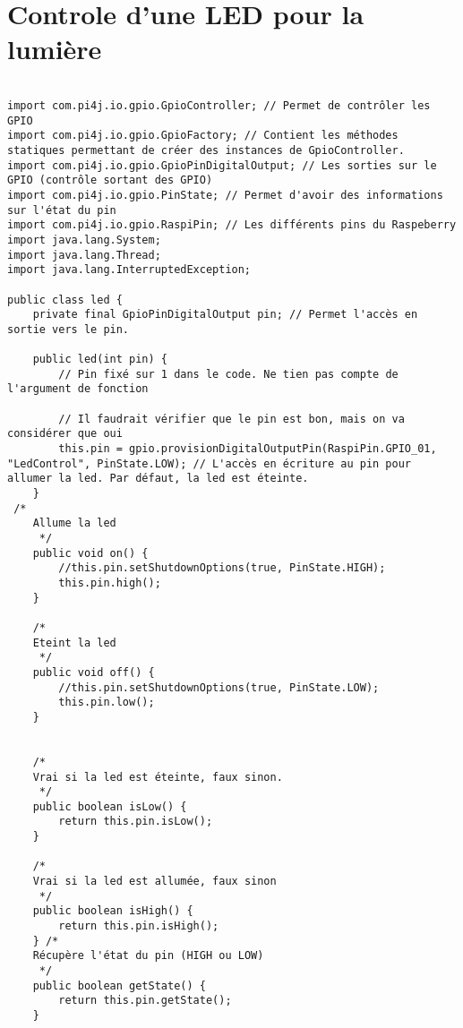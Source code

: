 \documentclass{article}
\newenvironment{DDbox}[1]{
\begin{lrbox}{\BBbox}\begin{minipage}{\linewidth}}
{\end{minipage}\end{lrbox}\noindent\colorbox{Zgris}{\usebox{\BBbox}} \\
[.5cm]}
\begin{document}
\section*{Controle d'une LED pour la lumière}
\begin{DDbox}{\linewidth}
\begin{lstlisting}

import com.pi4j.io.gpio.GpioController; // Permet de contrôler les GPIO
import com.pi4j.io.gpio.GpioFactory; // Contient les méthodes statiques permettant de créer des instances de GpioController.
import com.pi4j.io.gpio.GpioPinDigitalOutput; // Les sorties sur le GPIO (contrôle sortant des GPIO)
import com.pi4j.io.gpio.PinState; // Permet d'avoir des informations sur l'état du pin
import com.pi4j.io.gpio.RaspiPin; // Les différents pins du Raspeberry
import java.lang.System;
import java.lang.Thread;
import java.lang.InterruptedException;

public class led {
    private final GpioPinDigitalOutput pin; // Permet l'accès en sortie vers le pin.

    public led(int pin) {
        // Pin fixé sur 1 dans le code. Ne tien pas compte de l'argument de fonction

        // Il faudrait vérifier que le pin est bon, mais on va considérer que oui
        this.pin = gpio.provisionDigitalOutputPin(RaspiPin.GPIO_01, "LedControl", PinState.LOW); // L'accès en écriture au pin pour allumer la led. Par défaut, la led est éteinte.
    }
 /*
    Allume la led
     */
    public void on() {
        //this.pin.setShutdownOptions(true, PinState.HIGH);
        this.pin.high();
    }

    /*
    Eteint la led
     */
    public void off() {
        //this.pin.setShutdownOptions(true, PinState.LOW);
        this.pin.low();
    }


    /*
    Vrai si la led est éteinte, faux sinon.
     */
    public boolean isLow() {
        return this.pin.isLow();
    }

    /*
    Vrai si la led est allumée, faux sinon
     */
    public boolean isHigh() {
        return this.pin.isHigh();
    } /*
    Récupère l'état du pin (HIGH ou LOW)
     */
    public boolean getState() {
        return this.pin.getState();
    }
\end{lstlisting}
\end{DDbox}
\newpage
\clearpage
\end{document}
